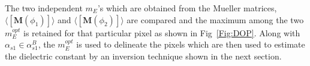 The two independent $m_{E}$'s which are obtained from the Mueller matrices, $\langle[{\mathbf{M}}(\phi_1)]\rangle$ and $\langle[{\mathbf{M}}(\phi_2)]\rangle$ are compared and the maximum among the two $m_{E}^{opt}$ is retained for that particular pixel as shown in Fig~\ref{Fig:DOP}. Along with $\alpha_{s1} \in \alpha_{s1}^{B}$, the $m_{E}^{opt}$ is used to delineate the pixels which are then used to estimate the dielectric constant by an inversion technique shown in the next section.
\begin{figure}[!h]
	\centering
	 \hspace{1mm}
	\hspace{1mm}

\end{figure}
